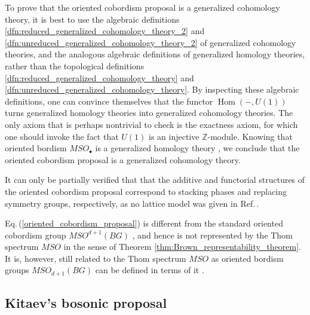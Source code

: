 \documentclass[sort&compress]{elsarticle}
\theoremstyle{theoremstyle}
\theoremstyle{framedtheoremstyle}
\theoremstyle{definitionstyle}
\theoremstyle{definitionstyle}
\theoremstyle{definitionstyle}
\theoremstyle{definitionstyle}
\theoremstyle{nameddefinitionstyle}
\theoremstyle{framednameddefinitionstyle}
\theoremstyle{proofstyle}
\theoremstyle{definitionstyle}
\newcommand{\ZZZ}{\mathbb{Z}}
\DeclareMathOperator{\Hom}{Hom}
\newcommand{\paren}[1]{\left( #1 \right)}
\begin{document}
\begin{appendices}
To prove that the oriented cobordism proposal is a generalized cohomology theory, it is best to use the algebraic definitions \ref{dfn:reduced_generalized_cohomology_theory_2} and \ref{dfn:unreduced_generalized_cohomology_theory_2} of generalized cohomology theories, and the analogous algebraic definitions \cite{Hatcher} of generalized homology theories, rather than the topological definitions \ref{dfn:reduced_generalized_cohomology_theory} and \ref{dfn:unreduced_generalized_cohomology_theory}.
By inspecting these algebraic definitions, one can convince themselves that the functor $\Hom\paren{ - , U(1)}$ turns generalized homology theories into generalized cohomology theories. The only axiom that is perhaps nontrivial to check is the exactness axiom, for which one should invoke the fact that $U(1)$ is an injective $\ZZZ$-module. 
Knowing that oriented bordism $MSO_\bullet$ is a generalized homology theory \cite{Adams1, Adams2, Atiyah}, we conclude that the oriented cobordism proposal is a generalized cohomology theory.

It can only be partially verified that that the additive and functorial structures of the oriented cobordism proposal correspond to stacking phases and replacing symmetry groups, respectively, as no lattice model was given in Ref.\,\cite{Kapustin_Boson}.

Eq.\,(\ref{oriented_cobordism_proposal}) is different from the standard oriented cobordism group $MSO^{d+1}\paren{BG}$ \cite{Kapustin_Boson}, and hence is not represented by the Thom spectrum $MSO$ in the sense of Theorem \ref{thm:Brown_representability_theorem}. It is, however, still related to the Thom spectrum $MSO$ as oriented bordism groups $MSO_{d+1}\paren{BG}$ can be defined in terms of it \cite{Adams1, Adams2, Atiyah}.





\subsection{Kitaev's bosonic proposal \label{subapp:Kitaev_bosonic_proposal}}


\end{appendices}
\end{document}
